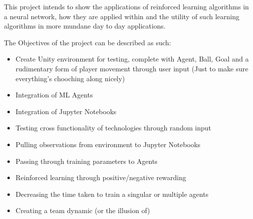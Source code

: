 This project intends to show the applications of reinforced learning algorithms in a neural network, how they are applied within and the utility of such learning algorithms in more mundane day to day applications.



The Objectives of the project can be described as such:

\begin{itemize}
  \item Create Unity environment for testing, complete with Agent, Ball, Goal and a rudimentary form of player movement through user input (Just to make sure 
everything's chooching along nicely)
  \item Integration of ML Agents 
  \item Integration of Jupyter Notebooks
  \item Testing cross functionality of technologies through random input
  \item Pulling observations from environment to Jupyter Notebooks
  \item Passing through training parameters to Agents
  \item Reinforced learning through positive/negative rewarding
  \item Decreasing the time taken to train a singular or multiple agents
  \item Creating a team dynamic (or the illusion of)
\end{itemize}
